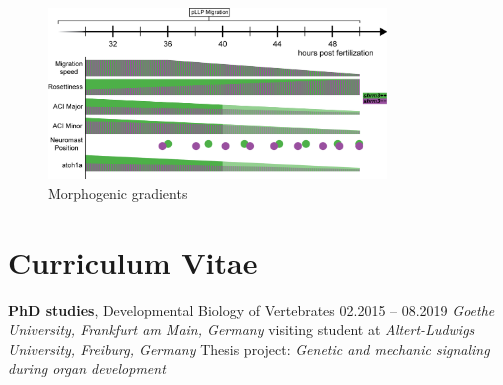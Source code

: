\documentclass[11pt,singlespacinge,twoside]{reedthesis} %
\begin{document}
\begin{figure}

{\centering \includegraphics[width=0.8\textwidth]{figures/supp/gradients} 

}

\caption[Morphogenic gradients]{Morphogenic gradients}\label{fig:supgrad}
\end{figure}
\hypertarget{curriculum-vitae}{%
\chapter*{Curriculum Vitae}\label{curriculum-vitae}}

 \hrulefill
\vspace{0.2cm}



\makebox[3cm][l]{}


\vspace{0.3cm}

 \hrulefill
\vspace{0.2cm}

\noindent \textbf{PhD studies}, Developmental Biology of Vertebrates \hfill 02.2015 -- 08.2019\newline
\emph{Goethe University, Frankfurt am Main, Germany}\newline
visiting student at \emph{Altert-Ludwigs University, Freiburg, Germany}\newline
Thesis project: \emph{Genetic and mechanic signaling during organ development}

\vspace{0.3cm}
\end{document}
